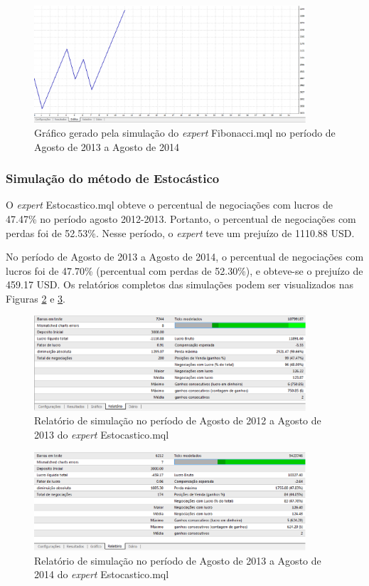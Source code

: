 \begin{figure}[H]
\centering
\includegraphics[width=0.9\textwidth]{figuras/protocoloFib4}
\caption{Gráfico gerado pela simulação do \textit{expert} Fibonacci.mql no período de Agosto de 2013 a Agosto de 2014}
\label{protocoloFib4}
\end{figure}

\subsubsection{Simulação do método de Estocástico}

O \textit{expert} Estocastico.mql obteve o percentual de negociações com lucros de 47.47\% no período agosto 2012-2013. Portanto, o percentual de negociações com perdas foi de 52.53\%. Nesse período, o \textit{expert} teve um prejuízo de 1110.88 USD.

No período de Agosto de 2013 a Agosto de 2014, o percentual de negociações com lucros foi de 47.70\% (percentual com perdas de 52.30\%),  e obteve-se o prejuízo de 459.17 USD. 
Os relatórios completos das simulações podem ser visualizados nas Figuras \ref{protocoloEst} e \ref{protocoloEst2}.

\begin{figure}[H]
\centering
\includegraphics[width=0.9\textwidth]{figuras/protocoloEst}
\caption{Relatório de simulação no período de Agosto de 2012 a Agosto de 2013 do \textit{expert} Estocastico.mql}
\label{protocoloEst}
\end{figure}

\begin{figure}[H]
\centering
\includegraphics[width=0.9\textwidth]{figuras/protocoloEst2}
\caption{Relatório de simulação no período de Agosto de 2013 a Agosto de 2014 do \textit{expert} Estocastico.mql}
\label{protocoloEst2}
\end{figure}

